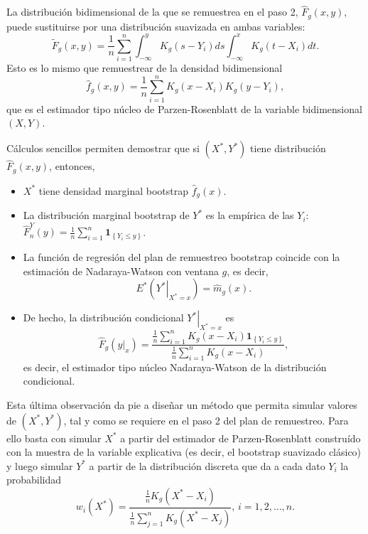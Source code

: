 \documentclass[
]{book}
\theoremstyle{break}
\theoremstyle{definition}
\theoremstyle{definition}
\theoremstyle{definition}
\theoremstyle{remark}
\begin{document}
La distribución bidimensional de la que se remuestrea en el paso 2,
\(\hat{F}_{g}\left( x,y \right)\), puede sustituirse por una distribución
suavizada en ambas variables:
\[\tilde{F}_{g}\left( x,y \right) =\frac{1}{n}\sum_{i=1}^{n}
\int_{-\infty}^{y}K_{g}\left( s-Y_i \right) ds \int_{-\infty }^{x}
K_{g}\left( t-X_i \right) dt.\]
Esto es lo mismo que remuestrear de la densidad bidimensional
\[\hat{f}_{g}\left( x,y \right) = \frac{1}{n}\sum_{i=1}^{n}
K_{g}\left( x-X_i \right) K_{g}\left( y-Y_i \right),\]
que es el estimador tipo
núcleo de Parzen-Rosenblatt de la variable bidimensional
\(\left( X,Y \right)\).

Cálculos sencillos permiten demostrar que si \(\left( X^{\ast},Y^{\ast} \right)\) tiene distribución \(\hat{F}_{g}\left( x,y \right)\), entonces,

\begin{itemize}
\item
  \(X^{\ast}\) tiene densidad marginal bootstrap \(\hat{f}_{g}\left( x \right)\).
\item
  La distribución marginal bootstrap de \(Y^{\ast}\) es la empírica de
  las \(Y_i\): \(\hat{F}_n^{Y}\left( y \right) =\frac{1}{n} \sum_{i=1}^{n}\mathbf{1}_{\left\{ Y_i\leq y\right\} }\).
\item
  La función de regresión del plan de remuestreo bootstrap coincide
  con la estimación de Nadaraya-Watson con ventana \(g\), es decir,
  \[E^{\ast}\left( \left. Y^{\ast}\right\vert _{X^{\ast}=x} \right)
  =\hat{m}_{g}\left( x \right).\]
\item
  De hecho, la distribución condicional \(\left. Y^{\ast}\right\vert _{X^{\ast}=x}\) es
  \[\hat{F}_{g}\left( \left. y\right\vert _{x} \right) =\frac{\frac{1}{n}
  \sum_{i=1}^{n}K_{g}\left( x-X_i \right) \mathbf{1}_{\left\{ Y_i\leq
  y\right\} }}{\frac{1}{n}\sum_{i=1}^{n}K_{g}\left( x-X_i \right)},\]
  es decir, el estimador tipo núcleo Nadaraya-Watson de la distribución
  condicional.
\end{itemize}

Esta última observación da pie a diseñar un método que permita simular
valores de \(\left( X^{\ast},Y^{\ast} \right)\), tal y como se requiere
en el paso 2 del plan de remuestreo. Para ello basta con simular
\(X^{\ast}\) a partir del estimador de Parzen-Rosenblatt construído con
la muestra de la variable explicativa (es decir, el bootstrap suavizado
clásico) y luego simular \(Y^{\ast}\) a partir de la distribución
discreta que da a cada dato \(Y_i\) la probabilidad
\[w_i\left( X^{\ast} \right) =\frac{\frac{1}{n}K_{g}\left( X^{\ast}
-X_i \right)}{\frac{1}{n}\sum_{j=1}^{n}K_{g}\left( X^{\ast}-X_j \right)}
\text{, }i=1,2,\ldots ,n\text{.}\]
\end{document}
